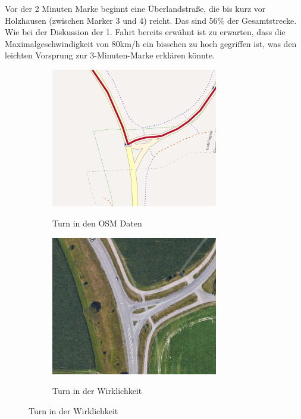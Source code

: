 Vor der 2 Minuten Marke beginnt eine Überlandstraße, die bis kurz vor Holzhausen (zwischen Marker 3 und 4) reicht.
Das sind 56$\%$ der Gesamtstrecke.
Wie bei der Diskussion der 1. Fahrt bereits erwähnt ist zu erwarten, dass die Maximalgeschwindigkeit von 80km/h ein bisschen zu hoch gegriffen ist, was den leichten Vorsprung zur 3-Minuten-Marke erklären könnte.

\begin{figure}[h]
\centering
\caption{Fahrt 3 -- Vergleich eines Turns}
\label{fig:turn}
\begin{subfigure}{0.49\textwidth}
\centering
\includegraphics[width = 0.80\textwidth]{../media/Fahrt3_Turn.png} \\
\caption{Turn in den OSM Daten}
\label{fig:turnosm}
\end{subfigure}
\begin{subfigure}{0.49\textwidth}
\centering
\includegraphics[width = 0.80\textwidth]{../media/Fahrt3_actualturn.png} \\
\caption{Turn in der Wirklichkeit}
\label{fig:turnworld}
\end{subfigure}
\end{figure}

